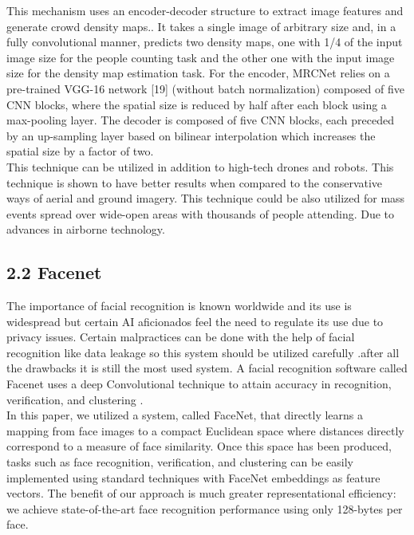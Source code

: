 \documentclass[eng]{FCEFyN-class}
\begin{document}
This mechanism uses an encoder-decoder structure to extract image features and generate crowd density maps.. It takes a single image of arbitrary
size and, in a fully convolutional manner, predicts two density maps, one with 1/4 of the
input image size for the people counting task and the other one with the input image size for
the density map estimation task. For the encoder, MRCNet relies on a pre-trained VGG-16
network [19] (without batch normalization) composed of five CNN blocks, where the spatial
size is reduced by half after each block using a max-pooling layer. The decoder is composed
of five CNN blocks, each preceded by an up-sampling layer based on bilinear interpolation
which increases the spatial size by a factor of two. \hypersetup{citecolor=red}\cite{MRC}\\

This technique can be utilized in addition to high-tech drones and robots. This technique is shown to have better results when compared to the conservative ways of aerial and ground imagery.
This technique could be also utilized for mass events spread over wide-open areas with thousands of people attending. Due to advances in airborne technology.

\subsection{2.2 Facenet}
The importance of facial recognition is known worldwide and its use is widespread but certain AI aficionados feel the need to regulate its use due to privacy issues. 
Certain malpractices can be done with the help of facial recognition like data leakage so this system should be utilized carefully .after all the drawbacks it is still the most used system. 
A facial recognition software called Facenet uses a deep Convolutional technique to attain accuracy in recognition, verification, and clustering .\\

 In this paper, we utilized a system, called FaceNet, that directly learns a mapping from face images to a compact Euclidean space where distances directly correspond to a measure of face similarity. Once this space has been produced, tasks such as face recognition, verification, and clustering can be easily implemented using standard techniques with FaceNet embeddings as feature vectors.
 The benefit of our approach is much greater representational efficiency: we achieve state-of-the-art face recognition performance using only 128-bytes per face. \cite{Facenet}\\
\end{document}
